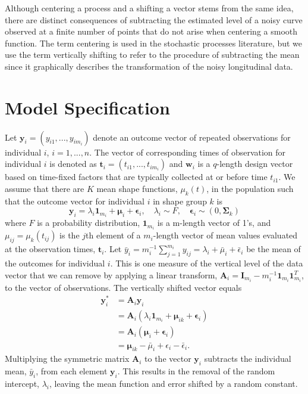 \documentclass[12pt]{article}
\newcommand{\B}[0]{\mathbf}
\newcommand{\bs}[0]{\boldsymbol}
\begin{document}
 Although centering a process and a shifting a vector stems from the same idea, there are distinct consequences of subtracting the estimated level of a noisy curve observed at a finite number of points that do not arise when centering a smooth function. The term centering is used in the stochastic processes literature, but we use the term vertically shifting to refer to the procedure of subtracting the mean since it graphically describes the transformation of the noisy longitudinal data.

\section{Model Specification}
 Let $\B y_{i}=(y_{i1},...,y_{im_{i}})$ denote an outcome vector of repeated observations for individual $i$, $i=1,...,n$. The vector of corresponding times of observation for individual $i$ is denoted as $\B t_{i}=(t_{i1},...,t_{im_{i}})$ and $\B w_{i}$ is a $q$-length design vector based on time-fixed factors that are typically collected at or before time $t_{i1}$. We assume that there are $K$ mean shape functions, $\mu_{k}(t)$, in the population such that the outcome vector for individual $i$ in shape group $k$ is
 $$\B y_{i} = \lambda_{i}\B 1_{m_{i}}+\bs\mu_{i}+\bs\epsilon_{i},\quad \lambda_{i}\sim F, \quad \bs\epsilon_{i}\sim(0,\bs\Sigma_{k})$$
 where $F$ is a probability distribution, $\B 1_{m_{i}}$ is a m-length vector of 1's, and $\mu_{ij} = \mu_{k}(t_{ij})$ is the $j$th element of a $m_{i}$-length vector of mean values evaluated at the observation times, $\B t_{i}$. Let $\bar{y}_{i}= m_{i}^{-1}\sum^{m_{i}}_{j=1} y_{ij} = \lambda_{i}+\bar{\mu}_{i}+\bar{\epsilon}_{i}$ be the mean of the outcomes for individual $i$. This is one measure of the vertical level of the data vector that we can remove by applying a linear transform, $\B A_{i} = \B I_{m_{i}} - m_{i}^{-1}\B 1_{m_{i}}\B 1_{m_{i}}^{T}$, to the vector of observations. The vertically shifted vector equals 
\begin{align*}
\B y^{*}_{i} &= \B A_{i}\B y_{i}\\
&=\B A_{i}(\lambda_{i}\B 1_{m_{i}}+\bs\mu_{ik}+\bs\epsilon_{i})\\
&=\B A_{i}(\bs\mu_{i}+\bs\epsilon_{i})\\
&=\bs\mu_{ik} - \bar{\mu}_{i}+\epsilon_{i}-\bar{\epsilon}_{i}.
\end{align*}
Multiplying the symmetric matrix $\B A_{i}$ to the vector $\B y_{i}$ subtracts the individual mean, $\bar{y}_{i}$, from each element $\B y_{i}$. This results in the removal of the random intercept, $\lambda_{i}$, leaving the mean function and error shifted by a random constant. 
\end{document}
